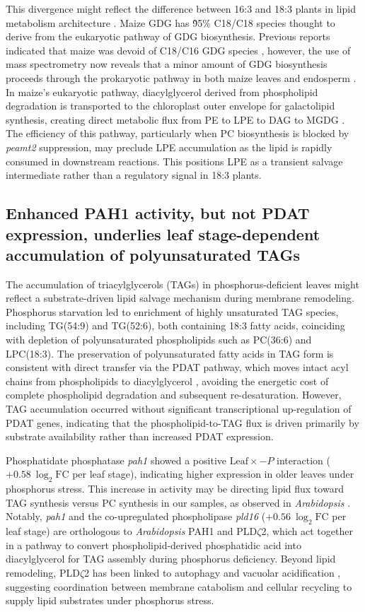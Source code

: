 \documentclass[9pt,twocolumn,twoside]{rilabRxiv}
\begin{document}
This divergence might reflect the difference between 16:3 and 18:3 plants in lipid metabolism architecture \cite{mongrand1998,heinz1983}.
Maize GDG has \~95\% C18/C18 species thought to derive from the eukaryotic pathway of GDG biosynthesis. Previous reports indicated that maize was devoid of C18/C16 GDG species \cite{mongrand1998}, however, the use of mass spectrometry now reveals that a minor amount of GDG biosynthesis proceeds through the prokaryotic pathway in both maize leaves and endosperm \cite{myers2011}.
In maize's eukaryotic pathway, diacylglycerol derived from phospholipid degradation is transported to the chloroplast outer envelope for galactolipid synthesis, creating direct metabolic flux from PE to LPE to DAG to MGDG \cite{gu2017}.
The efficiency of this pathway, particularly when PC biosynthesis is blocked by \textit{peamt2} suppression, may preclude LPE accumulation as the lipid is rapidly consumed in downstream reactions.
This positions LPE as a transient salvage intermediate rather than a regulatory signal in 18:3 plants.

\subsection*{Enhanced PAH1 activity, but not PDAT expression, underlies leaf stage-dependent accumulation of polyunsaturated TAGs }

The accumulation of triacylglycerols (TAGs) in phosphorus-deficient leaves might reflect a substrate-driven lipid salvage mechanism during membrane remodeling. Phosphorus starvation led to enrichment of highly unsaturated TAG species, including TG(54:9) and TG(52:6), both containing 18:3 fatty acids, coinciding with depletion of polyunsaturated phospholipids such as PC(36:6) and LPC(18:3). 
The preservation of polyunsaturated fatty acids in TAG form is consistent with direct transfer via the PDAT pathway, which moves intact acyl chains from phospholipids to diacylglycerol \cite{chen2012}, avoiding the energetic cost of complete phospholipid degradation and subsequent re-desaturation. 
However, TAG accumulation occurred without significant transcriptional up-regulation of PDAT genes, indicating that the phospholipid-to-TAG flux is driven primarily by substrate availability rather than increased PDAT expression.

Phosphatidate phosphatase \textit{pah1} showed a positive $\text{Leaf} \times -P$ interaction ($+0.58\ \log_2\text{FC}$ per leaf stage), indicating higher expression in older leaves under phosphorus stress.  
This increase in activity may be directing lipid flux toward TAG synthesis versus PC synthesis in our samples, as observed in \textit{Arabidopsis} \cite{eastmond2010}.  
Notably, \textit{pah1} and the co-upregulated phospholipase \textit{pld16} ($+0.56\ \log_2\text{FC}$ per leaf stage) are orthologous to \textit{Arabidopsis} PAH1 and PLD$\zeta$2, which act together in a pathway to convert phospholipid-derived phosphatidic acid into diacylglycerol for TAG assembly during phosphorus deficiency.  
Beyond lipid remodeling, PLD$\zeta$2 has been linked to autophagy and vacuolar acidification \cite{guan2025}, suggesting coordination between membrane catabolism and cellular recycling to supply lipid substrates under phosphorus stress.
\end{document}
